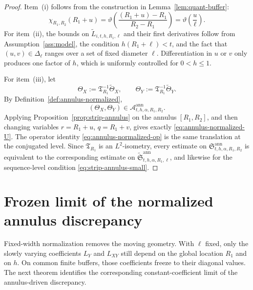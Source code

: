 \documentclass[11pt,a4paper]{amsart}
\theoremstyle{plain}
\theoremstyle{definition}
\theoremstyle{remark}
\begin{document}
\begin{proof}
Item~(i) follows from the construction in Lemma~\ref{lem:quant-buffer}:
\[
\chi_{R_1,R_2}(R_1+u)
=
\vartheta\!\left(\frac{(R_1+u)-R_1}{R_2-R_1}\right)
=
\vartheta\!\left(\frac{u}{\ell}\right).
\]
For item~(ii), the bounds on \(\widetilde L_{i,t,h,R_1,\ell}\) and their first derivatives follow
from Assumption~\ref{ass:model}, the condition \(h(R_1+\ell)<t\), and the fact that
\((u,v)\in\Delta_\ell\) ranges over a set of fixed diameter \(\ell\). Differentiation in \(u\) or
\(v\) only produces one factor of \(h\), which is uniformly controlled for \(0<h\le1\).

For item~(iii), let
\[
\Theta_X:=\mathfrak T_{R_1}^{-1}\widetilde\Theta_X,
\qquad
\Theta_Y:=\mathfrak T_{R_1}^{-1}\widetilde\Theta_Y.
\]
By Definition~\ref{def:annulus-normalized},
\[
(\Theta_X,\Theta_Y)\in \mathcal A_{t,h,\alpha,R_1,R_2}^{\mathrm{ann}}.
\]
Applying Proposition~\ref{prop:strip-annulus} on the annulus \([R_1,R_2]\), and then changing
variables \(r=R_1+u\), \(q=R_1+v\), gives exactly \eqref{eq:annulus-normalized-U}. The operator
identity \eqref{eq:annulus-normalized-op} is the same translation at the conjugated level.
Since \(\mathfrak T_{R_1}\) is an \(L^2\)-isometry, every estimate on
\(\mathfrak S_{t,h,\alpha,R_1,R_2}^{\mathrm{ann}}\) is equivalent to the corresponding estimate on
\(\widetilde{\mathfrak S}_{t,h,\alpha,R_1,\ell}^{\mathrm{ann}}\), and likewise for the
sequence-level condition \eqref{eq:strip-annulus-small}.
\end{proof}

\section{Frozen limit of the normalized annulus discrepancy}
\label{sec:annulus-frozen}

Fixed-width normalization removes the moving geometry.  With \(\ell\) fixed, only the slowly
varying coefficients \(L_Y\) and \(L_{XY}\) still depend on the global location \(R_1\) and on
\(h\).  On common finite buffers, those coefficients freeze to their diagonal values.  The next
theorem identifies the corresponding constant-coefficient limit of the annulus-driven discrepancy.
\end{document}
